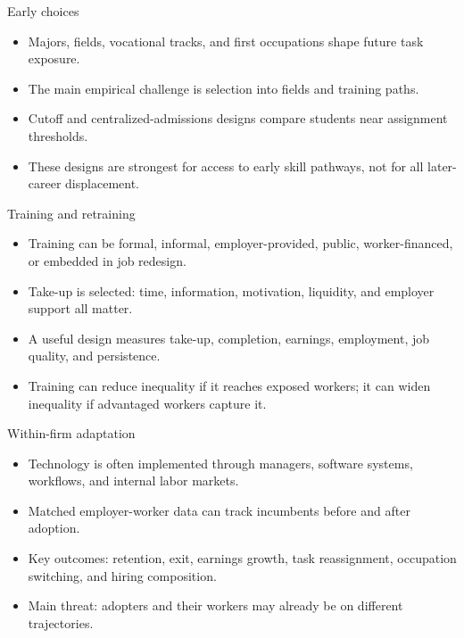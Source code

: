 \documentclass[aspectratio=169,11pt]{beamer}
\begin{document}
\begin{frame}{Early choices}
\begin{itemize}
    \item Majors, fields, vocational tracks, and first occupations shape future task exposure.
    \item The main empirical challenge is selection into fields and training paths.
    \item Cutoff and centralized-admissions designs compare students near assignment thresholds.
    \item These designs are strongest for access to early skill pathways, not for all later-career displacement.
\end{itemize}
\end{frame}

\begin{frame}{Training and retraining}
\begin{itemize}
    \item Training can be formal, informal, employer-provided, public, worker-financed, or embedded in job redesign.
    \item Take-up is selected: time, information, motivation, liquidity, and employer support all matter.
    \item A useful design measures take-up, completion, earnings, employment, job quality, and persistence.
    \item Training can reduce inequality if it reaches exposed workers; it can widen inequality if advantaged workers capture it.
\end{itemize}
\end{frame}

\begin{frame}{Within-firm adaptation}
\begin{itemize}
    \item Technology is often implemented through managers, software systems, workflows, and internal labor markets.
    \item Matched employer-worker data can track incumbents before and after adoption.
    \item Key outcomes: retention, exit, earnings growth, task reassignment, occupation switching, and hiring composition.
    \item Main threat: adopters and their workers may already be on different trajectories.
\end{itemize}
\end{frame}
\end{document}
